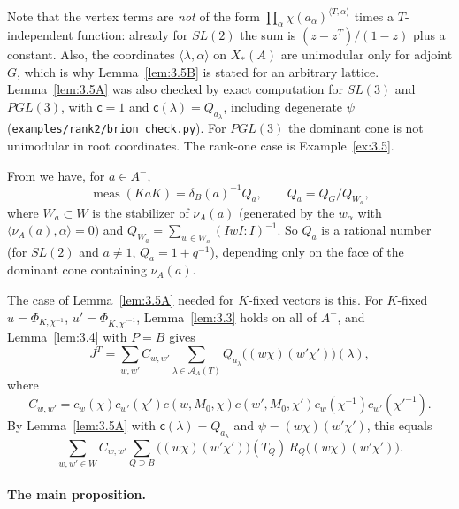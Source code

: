 \documentclass[12pt,letterpaper]{article}
\numberwithin{equation}{section}
\theoremstyle{plain}
\theoremstyle{remark}
\theoremstyle{plain}
\theoremstyle{definition}
\theoremstyle{remark}
\theoremstyle{remark}
\newcommand{\cA}{\mathcal{A}}
\newcommand{\ip}[1]{\langle #1\rangle}
\DeclareMathOperator{\meas}{meas}
\begin{document}
\begin{rem26}\label{r:brion}
Note that the vertex terms are \emph{not} of the form $\prod_\alpha\chi(a_\alpha)^{\ip{T,\alpha}}$ times a $T$-independent function: already for $SL(2)$ the sum is $(z-z^{T})/(1-z)$ plus a constant. Also, the coordinates $\ip{\lambda,\alpha}$ on $X_*(A)$ are unimodular only for adjoint $G$, which is why Lemma~\ref{lem:3.5B} is stated for an arbitrary lattice. Lemma~\ref{lem:3.5A} was also checked by exact computation for $SL(3)$ and $PGL(3)$, with $\mathsf c=1$ and $\mathsf c(\lambda)=Q_{a_\lambda}$, including degenerate $\psi$ (\texttt{examples/rank2/brion\_check.py}). For $PGL(3)$ the dominant cone is not unimodular in root coordinates. The rank-one case is Example~\ref{ex:3.5}.
\end{rem26}

From \cite[Prop.~3.2.15]{Ma71} we have, for $a\in A^-$,
\setcounter{equation}{6}\begin{equation}\label{eq:3.7}
\meas(KaK)=\delta_B(a)^{-1}Q_a,\qquad Q_a=Q_G/Q_{W_a},
\end{equation}
where $W_a\subset W$ is the stabilizer of $\nu_A(a)$ (generated by the $w_\alpha$ with $\ip{\nu_A(a),\alpha}=0$) and $Q_{W_a}=\sum_{w\in W_a}(IwI:I)^{-1}$. So $Q_a$ is a rational number (for $SL(2)$ and $a\ne1$, $Q_a=1+q^{-1}$), depending only on the face of the dominant cone containing $\nu_A(a)$.

The case of Lemma~\ref{lem:3.5A} needed for $K$-fixed vectors is this. For $K$-fixed $u=\Phi_{K,\chi^{-1}}$, $u'=\Phi_{K,\chi'^{-1}}$, Lemma~\ref{lem:3.3} holds on all of $A^-$, and Lemma~\ref{lem:3.4} with $P=B$ gives
\[
J^T=\sum_{w,w'}C_{w,w'}\sum_{\lambda\in\cA_A(T)}Q_{a_\lambda}\big((w\chi)(w'\chi')\big)(\lambda),
\]
where
\[
C_{w,w'}=c_w(\chi)c_{w'}(\chi')c(w,M_0,\chi)c(w',M_0,\chi')c_w(\chi^{-1})c_{w'}(\chi'^{-1}).
\] By Lemma~\ref{lem:3.5A} with $\mathsf c(\lambda)=Q_{a_\lambda}$ and $\psi=(w\chi)(w'\chi')$, this equals
\begin{equation}\label{eq:3.8}
\sum_{w,w'\in W}C_{w,w'}\sum_{Q\supseteq B}\big((w\chi)(w'\chi')\big)(T_Q)\,R_Q\big((w\chi)(w'\chi')\big).
\end{equation}

\paragraph{The main proposition.}
\end{document}
